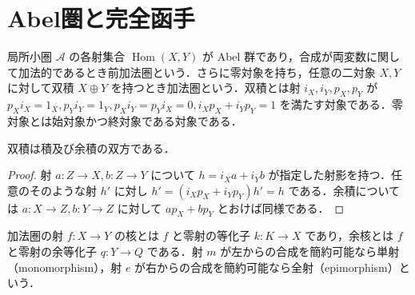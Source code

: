 \section{Abel圏と完全函手}
\begin{defn}[前加法圏と加法圏]
局所小圏 $\mathcal A$ の各射集合 $\operatorname{Hom}(X,Y)$ が Abel 群であり，合成が両変数に関して加法的であるとき前加法圏という．さらに零対象を持ち，任意の二対象 $X,Y$ に対して双積 $X\oplus Y$ を持つとき加法圏という．双積とは射 $i_X,i_Y,p_X,p_Y$ が $p_Xi_X=1_X,p_Yi_Y=1_Y,p_Xi_Y=p_Yi_X=0,i_Xp_X+i_Yp_Y=1$ を満たす対象である．零対象とは始対象かつ終対象である対象である．
\end{defn}
\begin{prop}[双積の二つの普遍性]
双積は積及び余積の双方である．
\end{prop}
\begin{proof}
射 $a:Z\to X,b:Z\to Y$ について $h=i_Xa+i_Yb$ が指定した射影を持つ．任意のそのような射 $h'$ に対し $h'=(i_Xp_X+i_Yp_Y)h'=h$ である．余積については $a:X\to Z,b:Y\to Z$ に対して $a p_X+b p_Y$ とおけば同様である．
\end{proof}
\begin{defn}[圏における核と余核]
加法圏の射 $f:X\to Y$ の核とは $f$ と零射の等化子 $k:K\to X$ であり，余核とは $f$ と零射の余等化子 $q:Y\to Q$ である．射 $m$ が左からの合成を簡約可能なら単射（monomorphism），射 $e$ が右からの合成を簡約可能なら全射（epimorphism）という．
\end{defn}
